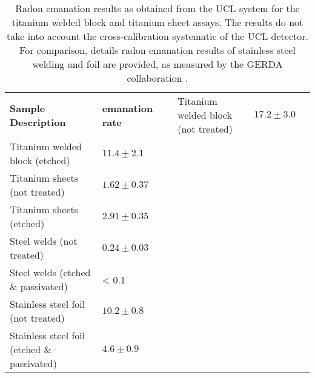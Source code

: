 \begin{table}[h!]
\centering
\caption{Radon emanation results as obtained from the UCL system for the titanium welded block and titanium sheet assays. The results do not take into account the cross-calibration systematic of the UCL detector. For comparison, details radon emanation results of stainless steel welding and foil are provided, as measured by the GERDA collaboration \cite{osti_20719228, ZUZEL2009889}.}
\label{tab:titanium_results}
\vspace{1mm}
\renewcommand{\arraystretch}{1.2}
    \begin{tabularx}{1\linewidth}{@{\extracolsep{\fill}}lll}
    \toprule
    
    \textbf{Sample Description} & %
    \textbf{\RnTTT{} emanation rate} & %
    \textbf{} & %
    
    \hline
    \hline
    
    Titanium welded block (not treated) & $17.2\pm3.0$  & \mBqms{} \\
    Titanium welded block (etched)      & $11.4\pm2.1$  & \mBqms{} \\
    Titanium sheets (not treated)       & $1.62\pm0.37$ & \mBqms{} \\
    Titanium sheets (etched)            & $2.91\pm0.35$ & \mBqms{} \\    

    \hline
    Steel welds (not treated)                   & $0.24\pm0.03$ & \mBqms{} \\       
    Steel welds (etched \& passivated)          & < 0.1         & \mBqms{} \\
    Stainless steel foil (not treated)          & $10.2\pm0.8$  & \uBqms{} \\
    Stainless steel foil (etched \& passivated) & $4.6\pm0.9$   & \uBqms{} \\
    \bottomrule
    \end{tabularx}
\end{table}